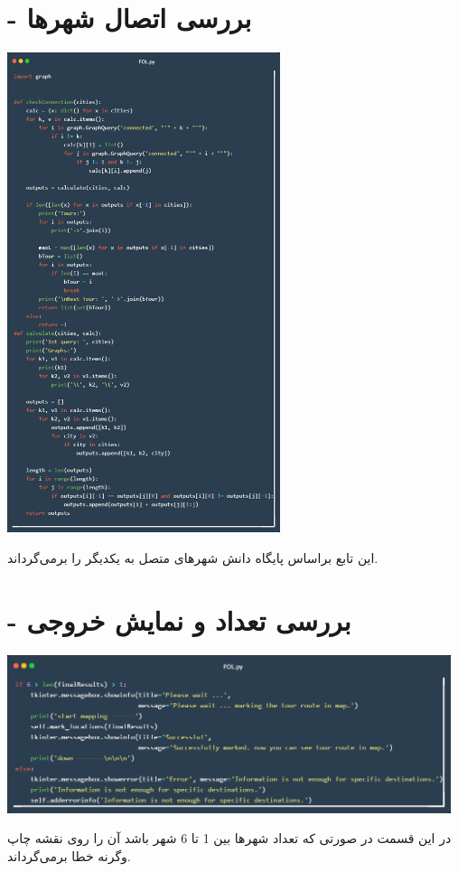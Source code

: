 \documentclass[12pt, dvipsnames, svgnames, x11names,]{article}
\begin{document}
	\section{ - بررسی اتصال شهرها}
				\begin{center}
			\includegraphics[width=8cm]{images/08}
		\end{center}
		{\normalsize این تابع براساس پایگاه دانش شهرهای متصل به یکدیگر را برمی‌گرداند.}
	
	\section{ - بررسی تعداد و نمایش خروجی}
		\begin{center}
			\includegraphics[width=13cm]{images/09}
		\end{center}
		{\normalsize در این قسمت در صورتی که تعداد شهرها بین 1 تا 6 شهر باشد آن را روی نقشه چاپ وگرنه خطا برمی‌گرداند.}
		
	
	
	
\end{document}
